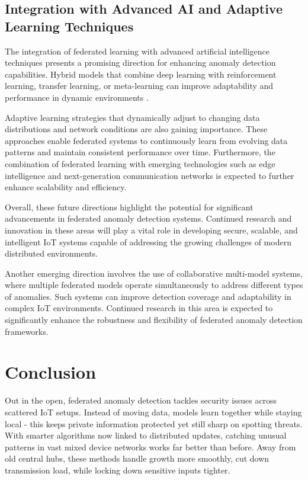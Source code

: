 \documentclass[12pt]{article}
\begin{document}
\subsection{Integration with Advanced AI and Adaptive Learning Techniques}

The integration of federated learning with advanced artificial intelligence techniques presents a promising direction for enhancing anomaly detection capabilities. Hybrid models that combine deep learning with reinforcement learning, transfer learning, or meta-learning can improve adaptability and performance in dynamic environments \cite{paper3,paper4}.

Adaptive learning strategies that dynamically adjust to changing data distributions and network conditions are also gaining importance. These approaches enable federated systems to continuously learn from evolving data patterns and maintain consistent performance over time. Furthermore, the combination of federated learning with emerging technologies such as edge intelligence and next-generation communication networks is expected to further enhance scalability and efficiency.

Overall, these future directions highlight the potential for significant advancements in federated anomaly detection systems. Continued research and innovation in these areas will play a vital role in developing secure, scalable, and intelligent IoT systems capable of addressing the growing challenges of modern distributed environments.

Another emerging direction involves the use of collaborative multi-model systems, where multiple federated models operate simultaneously to address different types of anomalies. Such systems can improve detection coverage and adaptability in complex IoT environments. Continued research in this area is expected to significantly enhance the robustness and flexibility of federated anomaly detection frameworks.


	\section{Conclusion}
	
Out in the open, federated anomaly detection tackles security issues across scattered IoT setups. Instead of moving data, models learn together while staying local - this keeps private information protected yet still sharp on spotting threats. With smarter algorithms now linked to distributed updates, catching unusual patterns in vast mixed device networks works far better than before. Away from old central hubs, these methods handle growth more smoothly, cut down transmission load, while locking down sensitive inputs tighter.
\end{document}
